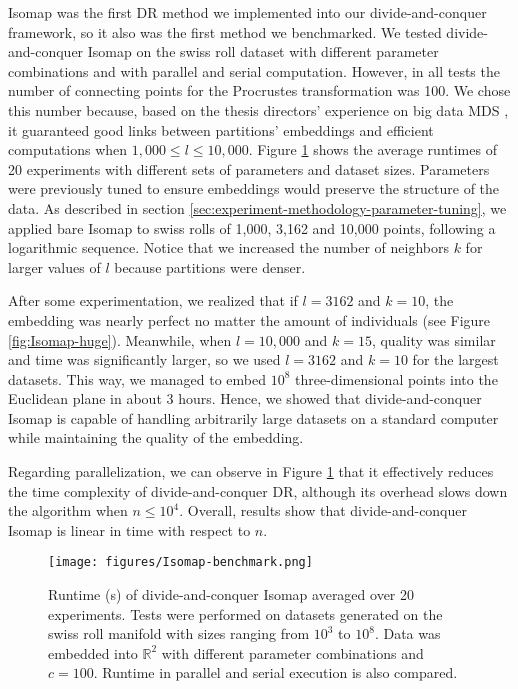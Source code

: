 Isomap was the first DR method we implemented into our divide-and-conquer framework, so it also was the first method we benchmarked. We tested divide-and-conquer Isomap on the swiss roll dataset with different parameter combinations and with parallel and serial computation. However, in all tests the number of connecting points for the Procrustes transformation was 100. We chose this number because, based on the thesis directors' experience on big data MDS \citep{Delicado2024}, it guaranteed good links between partitions' embeddings and efficient computations when $1,000 \leq l \leq 10,000$. Figure \ref{fig:Isomap-benchmark} shows the average runtimes of 20 experiments with different sets of parameters and dataset sizes. Parameters were previously tuned to ensure embeddings would preserve the structure of the data. As described in section \ref{sec:experiment-methodology-parameter-tuning}, we applied bare Isomap to swiss rolls of 1,000, 3,162 and 10,000 points, following a logarithmic sequence. Notice that we increased the number of neighbors $k$ for larger values of $l$ because partitions were denser.

After some experimentation, we realized that if $l=3162$ and $k=10$, the embedding was nearly perfect no matter the amount of individuals (see Figure \ref{fig:Isomap-huge}). Meanwhile, when $l=10,000$ and $k=15$, quality was similar and time was significantly larger, so we used $l=3162$ and $k=10$ for the largest datasets. This way, we managed to embed $10^8$ three-dimensional points into the Euclidean plane in about 3 hours. Hence, we showed that divide-and-conquer Isomap is capable of handling arbitrarily large datasets on a standard computer while maintaining the quality of the embedding.

Regarding parallelization, we can observe in Figure \ref{fig:Isomap-benchmark} that it effectively reduces the time complexity of divide-and-conquer DR, although its overhead slows down the algorithm when $n \leq 10^4$. Overall, results show that divide-and-conquer Isomap is linear in time with respect to $n$.

\begin{figure}
    \centering
    \texttt{[image: figures/Isomap-benchmark.png]}
    \caption{Runtime (s) of divide-and-conquer Isomap averaged over 20 experiments. Tests were performed on datasets generated on the swiss roll manifold \citep{Spiwokv2007} with sizes ranging from $10^3$ to $10^8$. Data was embedded into $\mathbb{R}^2$ with different parameter combinations and $c=100$. Runtime in parallel and serial execution is also compared.}
    \label{fig:Isomap-benchmark}
\end{figure}

